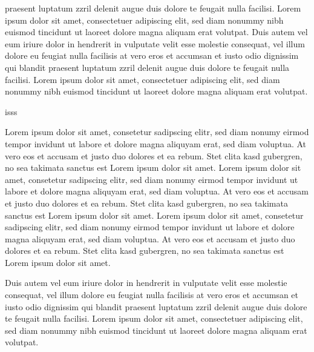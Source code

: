 \documentclass[a4paper,
	               twoside,
	               openright,
	               8pt,
	               final]
	               {memoir}
\begin{document}
\begin{pairs}
\begin{Rightside}
praesent luptatum zzril delenit augue duis dolore te feugait nulla facilisi. Lorem ipsum dolor sit
amet, consectetuer adipiscing elit, sed diam nonummy nibh euismod tincidunt ut laoreet dolore magna
aliquam erat volutpat.
Duis autem vel eum iriure dolor in hendrerit in vulputate velit esse molestie consequat, vel illum
dolore eu feugiat nulla facilisis at vero eros et accumsan et iusto odio dignissim qui blandit
praesent luptatum zzril delenit augue duis dolore te feugait nulla facilisi. Lorem ipsum dolor sit
amet, consectetuer adipiscing elit, sed diam nonummy nibh euismod tincidunt ut laoreet dolore magna
aliquam erat volutpat.
				\pend%
			\pausenumbering%
		\end{Rightside}%
	\end{pairs}%
\Columns%
\pagebreak
isss
	\begin{pairs}%
		\begin{Leftside}%
			\resumenumbering%
				\pstart%
 Lorem ipsum dolor sit amet, consetetur sadipscing elitr, sed diam nonumy eirmod tempor invidunt ut
labore et dolore magna aliquyam erat, sed diam voluptua. At vero eos et accusam et justo duo
dolores et ea rebum. Stet clita kasd gubergren, no sea takimata sanctus est Lorem ipsum dolor sit
amet. Lorem ipsum dolor sit amet, consetetur sadipscing elitr, sed diam nonumy eirmod tempor
invidunt ut labore et dolore magna aliquyam erat, sed diam voluptua. At vero eos et accusam et
justo duo dolores et ea rebum. Stet clita kasd gubergren, no sea takimata sanctus est Lorem ipsum
dolor sit amet. Lorem ipsum dolor sit amet, consetetur sadipscing elitr, sed diam nonumy eirmod
tempor invidunt ut labore et dolore magna aliquyam erat, sed diam voluptua. At vero eos et accusam
et justo duo dolores et ea rebum. Stet clita kasd gubergren, no sea takimata sanctus est Lorem
ipsum dolor sit amet.
				\pend%
			\pausenumbering%
		\end{Leftside}%
		\begin{Rightside}%
			\resumenumbering%
				\pstart%
 Duis autem vel eum iriure dolor in hendrerit in vulputate velit esse molestie consequat, vel illum
dolore eu feugiat nulla facilisis at vero eros et accumsan et iusto odio dignissim qui blandit
praesent luptatum zzril delenit augue duis dolore te feugait nulla facilisi. Lorem ipsum dolor sit
amet, consectetuer adipiscing elit, sed diam nonummy nibh euismod tincidunt ut laoreet dolore magna
aliquam erat volutpat.
				\pend%
			\pausenumbering%
		\end{Rightside}%
	\end{pairs}%
\Columns%
\end{document}
